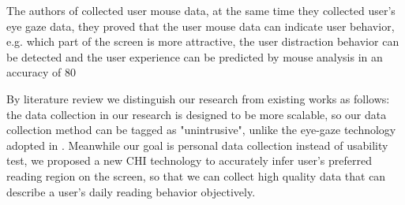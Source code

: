 \documentclass{sigchi}
\begin{document}
The authors of \cite{navalpakkam2012mouse} collected user mouse data, at the same time they collected user’s eye gaze data, they proved that the user mouse data can indicate user behavior, e.g. which part of the screen is more attractive, the user distraction behavior can be detected and the user experience can be predicted by mouse analysis in an accuracy of 80%


By literature review we distinguish our research from existing works as follows: the data collection in our research is designed to be more scalable, so our data collection method can be tagged as "unintrusive", unlike the eye-gaze technology adopted in \cite{navalpakkam2012mouse,lagun2011viewser}. Meanwhile our goal is personal data collection instead of usability test, we proposed a new CHI technology to accurately infer user’s preferred reading region on the screen, so that we can collect high quality data that can describe a user’s daily reading behavior objectively. 
\end{document}
